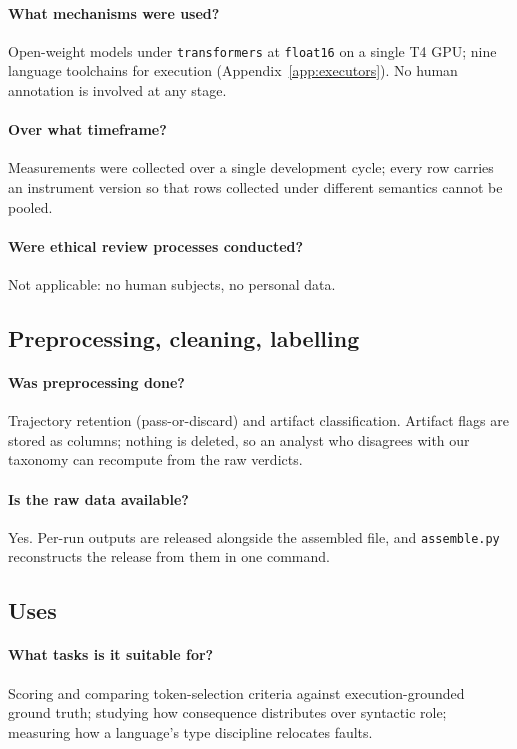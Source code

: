 \paragraph{What mechanisms were used?} Open-weight models under \texttt{transformers} at
\texttt{float16} on a single T4 GPU; nine language toolchains for execution
(Appendix~\ref{app:executors}). No human annotation is involved at any stage.

\paragraph{Over what timeframe?} Measurements were collected over a single development cycle; every
row carries an instrument version so that rows collected under different semantics cannot be pooled.

\paragraph{Were ethical review processes conducted?} Not applicable: no human subjects, no personal
data.

\subsection*{Preprocessing, cleaning, labelling}

\paragraph{Was preprocessing done?} Trajectory retention (pass-or-discard) and artifact
classification. Artifact flags are stored as columns; nothing is deleted, so an analyst who disagrees
with our taxonomy can recompute from the raw verdicts.

\paragraph{Is the raw data available?} Yes. Per-run outputs are released alongside the assembled
file, and \texttt{assemble.py} reconstructs the release from them in one command.

\subsection*{Uses}

\paragraph{What tasks is it suitable for?} Scoring and comparing token-selection criteria against
execution-grounded ground truth; studying how consequence distributes over syntactic role; measuring
how a language's type discipline relocates faults.

